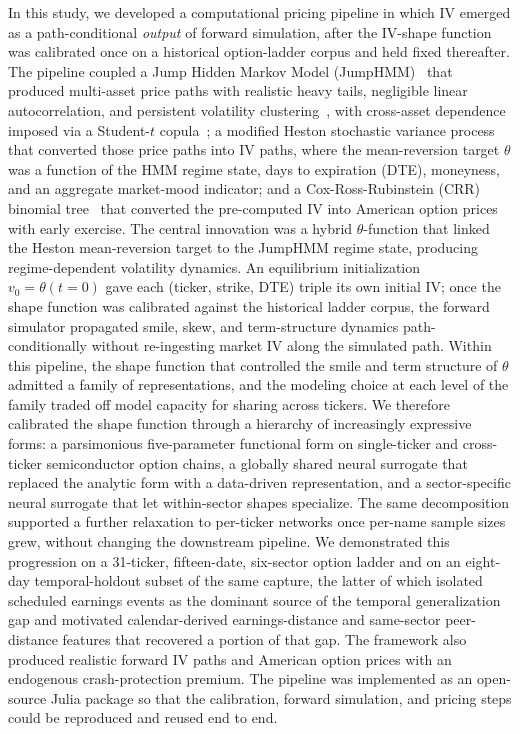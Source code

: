 In this study, we developed a computational pricing pipeline in which IV emerged as a path-conditional \emph{output} of forward simulation, after the IV-shape function was calibrated once on a historical option-ladder corpus and held fixed thereafter. The pipeline coupled a Jump Hidden Markov Model (JumpHMM)~\cite{jumphmm2025} that produced multi-asset price paths with realistic heavy tails, negligible linear autocorrelation, and persistent volatility clustering~\cite{cont2001}, with cross-asset dependence imposed via a Student-$t$ copula~\cite{demarta2005}; a modified Heston stochastic variance process~\cite{heston1993} that converted those price paths into IV paths, where the mean-reversion target $\theta$ was a function of the HMM regime state, days to expiration (DTE), moneyness, and an aggregate market-mood indicator; and a Cox-Ross-Rubinstein (CRR) binomial tree~\cite{cox1979} that converted the pre-computed IV into American option prices with early exercise. The central innovation was a hybrid $\theta$-function that linked the Heston mean-reversion target to the JumpHMM regime state, producing regime-dependent volatility dynamics. An equilibrium initialization $v_0 = \theta(t\!=\!0)$ gave each (ticker, strike, DTE) triple its own initial IV; once the shape function was calibrated against the historical ladder corpus, the forward simulator propagated smile, skew, and term-structure dynamics path-conditionally without re-ingesting market IV along the simulated path. Within this pipeline, the shape function that controlled the smile and term structure of $\theta$ admitted a family of representations, and the modeling choice at each level of the family traded off model capacity for sharing across tickers. We therefore calibrated the shape function through a hierarchy of increasingly expressive forms: a parsimonious five-parameter functional form on single-ticker and cross-ticker semiconductor option chains, a globally shared neural surrogate that replaced the analytic form with a data-driven representation, and a sector-specific neural surrogate that let within-sector shapes specialize. The same decomposition supported a further relaxation to per-ticker networks once per-name sample sizes grew, without changing the downstream pipeline. We demonstrated this progression on a 31-ticker, fifteen-date, six-sector option ladder and on an eight-day temporal-holdout subset of the same capture, the latter of which isolated scheduled earnings events as the dominant source of the temporal generalization gap and motivated calendar-derived earnings-distance and same-sector peer-distance features that recovered a portion of that gap. The framework also produced realistic forward IV paths and American option prices with an endogenous crash-protection premium. The pipeline was implemented as an open-source Julia package so that the calibration, forward simulation, and pricing steps could be reproduced and reused end to end.

